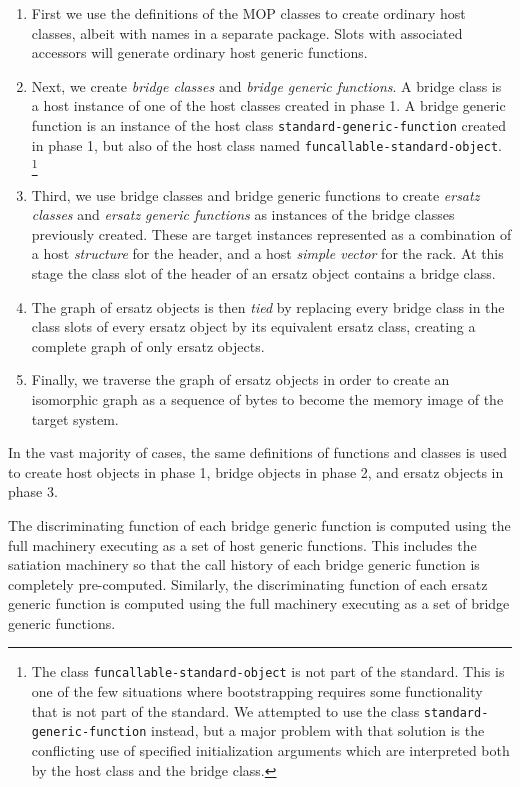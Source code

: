 \begin{enumerate}
\item First we use the definitions of the MOP classes to create
  ordinary host classes, albeit with names in a separate package.
  Slots with associated accessors will generate ordinary host generic
  functions. 
\item Next, we create \emph{bridge classes} and \emph{bridge generic
  functions}.  A bridge class is a host instance of one of the host
  classes created in phase 1.  A bridge generic function is an
  instance of the host class \texttt{standard-generic-function}
  created in phase 1, but also of the host class named
  \texttt{funcallable-standard-object}.%
  \footnote{The class \texttt{funcallable-standard-object} is not part
    of the \cl{} standard.  This is one of the few situations where
    bootstrapping \sicl{} requires some functionality that is not part
    of the standard.  We attempted to use the class
    \texttt{standard-generic-function} instead, but a major problem
    with that solution is the conflicting use of specified
    initialization arguments which are interpreted both by the host
    class and the bridge class.}
\item Third, we use bridge classes and bridge generic functions to
  create \emph{ersatz classes} and \emph{ersatz generic functions} as
  instances of the bridge classes previously created.  These are
  target instances represented as a combination of a host
  \emph{structure} for the header, and a host \emph{simple vector} for
  the rack.  At this stage the class slot of the header of an ersatz
  object contains a bridge class.
\item The graph of ersatz objects is then \emph{tied} by
  replacing every bridge class in the class slots of every ersatz
  object by its equivalent ersatz class, creating a complete graph of
  only ersatz objects. 
\item Finally, we traverse the graph of ersatz objects in order to
  create an isomorphic graph as a sequence of bytes to become the
  memory image of the target system.
\end{enumerate}

In the vast majority of cases, the same definitions of functions and
classes is used to create host objects in phase 1, bridge objects in
phase 2, and ersatz objects in phase 3. 

The discriminating function of each bridge generic function is
computed using the full machinery executing as a set of host generic
functions.  This includes the satiation machinery so that the call
history of each bridge generic function is completely pre-computed.
Similarly, the discriminating function of each ersatz generic function
is computed using the full machinery executing as a set of bridge
generic functions.  

